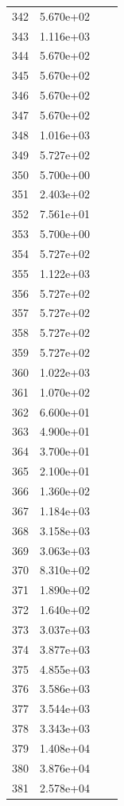 \documentclass[12pt]{article}
\begin{document}
\begin{longtable}{@{}cccc@{}}
342 & 5.670e+02 &  &  \\
343 & 1.116e+03 &  &  \\
344 & 5.670e+02 &  &  \\
345 & 5.670e+02 &  &  \\
346 & 5.670e+02 &  &  \\
347 & 5.670e+02 &  &  \\
348 & 1.016e+03 &  &  \\
349 & 5.727e+02 &  &  \\
350 & 5.700e+00 &  &  \\
351 & 2.403e+02 &  &  \\
352 & 7.561e+01 &  &  \\
353 & 5.700e+00 &  &  \\
354 & 5.727e+02 &  &  \\
355 & 1.122e+03 &  &  \\
356 & 5.727e+02 &  &  \\
357 & 5.727e+02 &  &  \\
358 & 5.727e+02 &  &  \\
359 & 5.727e+02 &  &  \\
360 & 1.022e+03 &  &  \\
361 & 1.070e+02 &  &  \\
362 & 6.600e+01 &  &  \\
363 & 4.900e+01 &  &  \\
364 & 3.700e+01 &  &  \\
365 & 2.100e+01 &  &  \\
366 & 1.360e+02 &  &  \\
367 & 1.184e+03 &  &  \\
368 & 3.158e+03 &  &  \\
369 & 3.063e+03 &  &  \\
370 & 8.310e+02 &  &  \\
371 & 1.890e+02 &  &  \\
372 & 1.640e+02 &  &  \\
373 & 3.037e+03 &  &  \\
374 & 3.877e+03 &  &  \\
375 & 4.855e+03 &  &  \\
376 & 3.586e+03 &  &  \\
377 & 3.544e+03 &  &  \\
378 & 3.343e+03 &  &  \\
379 & 1.408e+04 &  &  \\
380 & 3.876e+04 &  &  \\
381 & 2.578e+04 &  &  \\

\end{longtable}
\end{document}
